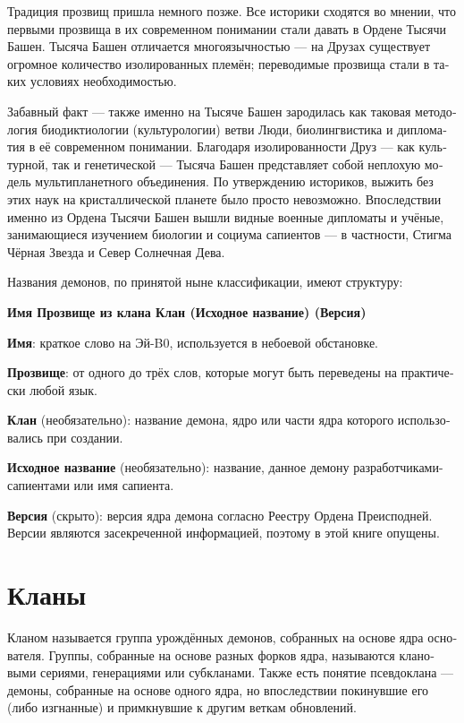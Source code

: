 \documentclass[a4paper,12pt,fleqn]{book}\usepackage{cooltooltips}\usepackage{polyglossia}\setdefaultlanguage[babelshorthands=true]{russian}\setotherlanguage{english}\defaultfontfeatures{Ligatures=TeX,Mapping=tex-text} \usepackage{xcolor}\definecolor{lightgray}{HTML}{bbbbbb}\color{lightgray}\newcommand{\ml}[3]{\textenglish{\textcolor{black}{#3}}}
\begin{document}
{Традиция прозвищ пришла немного позже.
Все историки сходятся во мнении, что первыми прозвища в их современном понимании стали давать в Ордене Тысячи Башен.
Тысяча Башен отличается многоязычностью --- на Друзах существует огромное количество изолированных племён;
переводимые прозвища стали в таких условиях необходимостью.

Забавный факт --- также именно на Тысяче Башен зародилась как таковая методология биодиктиологии (культурологии) ветви Люди, биолингвистика и дипломатия в её современном понимании.
Благодаря изолированности Друз --- как культурной, так и генетической --- Тысяча Башен представляет собой неплохую модель мультипланетного объединения.
По утверждению историков, выжить без этих наук на кристаллической планете было просто невозможно.
Впоследствии именно из Ордена Тысячи Башен вышли видные военные дипломаты и учёные, занимающиеся изучением биологии и социума сапиентов --- в частности, Стигма Чёрная Звезда и Север Солнечная Дева.

Названия демонов, по принятой ныне классификации, имеют структуру:

\textbf{Имя Прозвище из клана Клан (Исходное название) (Версия)}

\textbf{Имя}: краткое слово на Эй-B0, используется в небоевой обстановке.

\textbf{Прозвище}: от одного до трёх слов, которые могут быть переведены на практически любой язык.

\textbf{Клан} (необязательно): название демона, ядро или части ядра которого использовались при создании.

\textbf{Исходное название} (необязательно): название, данное демону разработчиками-сапиентами или имя сапиента.

\textbf{Версия} (скрыто): версия ядра демона согласно Реестру Ордена Преисподней.
Версии являются засекреченной информацией, поэтому в этой книге опущены.

\section{Кланы}

Кланом называется группа урождённых демонов, собранных на основе ядра основателя.
Группы, собранные на основе разных форков ядра, называются клановыми сериями, генерациями или субкланами.
Также есть понятие псевдоклана --- демоны, собранные на основе одного ядра, но впоследствии покинувшие его (либо изгнанные) и примкнувшие к другим веткам обновлений.

}
\end{document}
